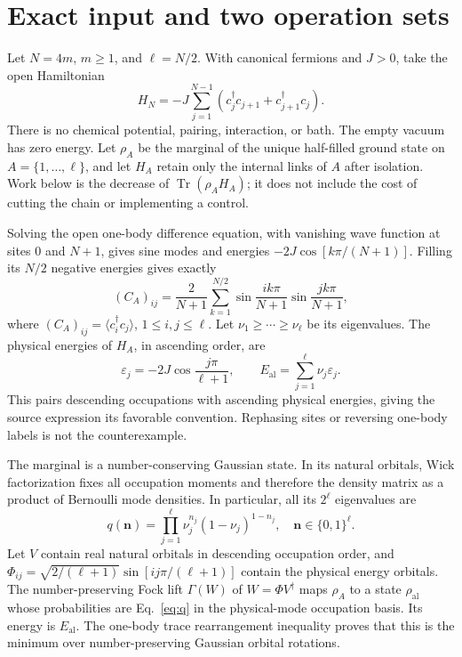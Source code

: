 \documentclass[aps,prb,reprint,amsmath,amssymb,longbibliography,floatfix]{revtex4-2}
\newcommand{\Tr}{\operatorname{Tr}}
\newcommand{\al}{\mathrm{al}}
\begin{document}
\section{Exact input and two operation sets}
Let $N=4m$, $m\geq1$, and $\ell=N/2$. With canonical fermions and $J>0$,
take the open Hamiltonian
\begin{equation}
 H_N=-J\sum_{j=1}^{N-1}(c_j^\dagger c_{j+1}+c_{j+1}^\dagger c_j).
 \label{eq:H}
\end{equation}
There is no chemical potential, pairing, interaction, or bath. The empty
vacuum has zero energy. Let $\rho_A$ be the marginal of the unique half-filled
ground state on $A=\{1,\ldots,\ell\}$, and let $H_A$ retain only the internal
links of $A$ after isolation. Work below is the decrease of $\Tr(\rho_AH_A)$;
it does not include the cost of cutting the chain or implementing a control.

Solving the open one-body difference equation, with vanishing wave function
at sites $0$ and $N+1$, gives sine modes and energies
$-2J\cos[k\pi/(N+1)]$. Filling its $N/2$ negative energies gives exactly
\begin{equation}
 (C_A)_{ij}=\frac{2}{N+1}\sum_{k=1}^{N/2}
 \sin\frac{ik\pi}{N+1}\sin\frac{jk\pi}{N+1},
 \label{eq:C}
\end{equation}
where $(C_A)_{ij}=\langle c_i^\dagger c_j\rangle$, $1\leq i,j\leq\ell$.
Let $\nu_1\geq\cdots\geq\nu_\ell$ be its eigenvalues. The physical energies
of $H_A$, in ascending order, are
\begin{equation}
 \varepsilon_j=-2J\cos\frac{j\pi}{\ell+1},\qquad
 E_{\al}=\sum_{j=1}^{\ell}\nu_j\varepsilon_j.
 \label{eq:align}
\end{equation}
This pairs descending occupations with ascending physical energies, giving the
source expression its favorable convention. Rephasing sites or reversing
one-body labels is not the counterexample.

The marginal is a number-conserving Gaussian state. In its natural orbitals,
Wick factorization fixes all occupation moments and therefore the density
matrix as a product of Bernoulli mode densities. In particular, all its
$2^\ell$ eigenvalues are
\begin{equation}
 q(\mathbf n)=\prod_{j=1}^{\ell}\nu_j^{n_j}(1-\nu_j)^{1-n_j},
 \quad\mathbf n\in\{0,1\}^{\ell}.
 \label{eq:q}
\end{equation}
Let $V$ contain real natural orbitals in descending occupation order, and
$\Phi_{ij}=\sqrt{2/(\ell+1)}\sin[ij\pi/(\ell+1)]$ contain the physical
energy orbitals. The number-preserving Fock lift $\Gamma(W)$ of
$W=\Phi V^\dagger$ maps $\rho_A$ to a state $\rho_{\al}$ whose probabilities
are Eq.~\eqref{eq:q} in the physical-mode occupation basis. Its energy is
$E_{\al}$. The one-body trace rearrangement inequality proves that this is
the minimum over number-preserving Gaussian orbital rotations.
\end{document}
